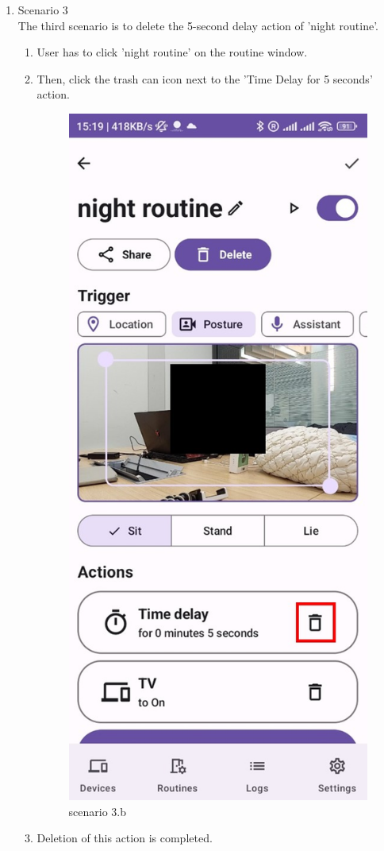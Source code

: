 \begin{enumerate}
    \item Scenario 3\\
    The third scenario is to delete the 5-second delay action of 'night routine'.\\
    \begin{enumerate}
        \item User has to click 'night routine' on the routine window.\\
        \item Then, click the trash can icon next to the 'Time Delay for 5 seconds' action.\\
    \begin{figure}
        \centering
        \includegraphics[width=0.5\linewidth]{imgs//usercase/scenario3-b.jpg}
        \caption{scenario 3.b}
        \label{fig:enter-label}
    \end{figure}
        \item Deletion of this action is completed.\\
    \begin{figure}
        \centering

\end{figure}
\end{enumerate}
\end{enumerate}
